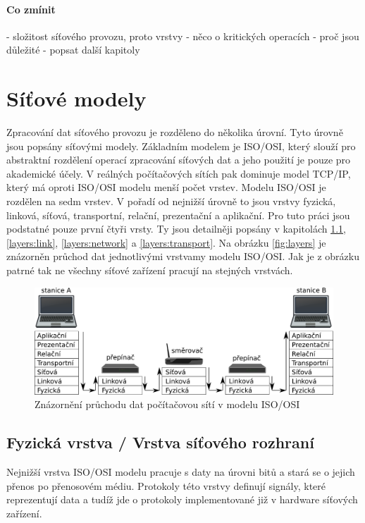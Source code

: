 \paragraph{Co zmínit}
- složitost síťového provozu, proto vrstvy
- něco o kritických operacích
- proč jsou důležité
- popsat další kapitoly

\section{Síťové modely}
Zpracování dat síťového provozu je rozděleno do několika úrovní. Tyto úrovně jsou popsány síťovými modely.
Základním modelem je ISO/OSI, který slouží pro abstraktní rozdělení operací zpracování síťových dat a jeho použití je
pouze pro akademické účely. V reálných počítačových sítích pak dominuje model TCP/IP, který má oproti
ISO/OSI modelu menší počet vrstev. Modelu ISO/OSI je rozdělen na sedm vrstev. V pořadí od nejnižší úrovně to
jsou vrstvy fyzická, linková, síťová, transportní, relační, prezentační a aplikační. Pro tuto práci jsou
podstatné pouze první čtyři vrsty. Ty jsou detailněji popsány v kapitolách \ref{layers:physical},
\ref{layers:link}, \ref{layers:network} a \ref{layers:transport}. Na obrázku \ref{fig:layers} je
znázorněn průchod dat jednotlivými vrstvamy modelu ISO/OSI. Jak je z obrázku patrné tak ne všechny síťové
zařízení pracují na stejných vrstvách.

\begin{figure}[!htb]
	\centering
	\includegraphics[scale=.25]{fig/layers.pdf}
	\caption{Znázornění průchodu dat počítačovou sítí v modelu ISO/OSI}
\end{figure}\label{fig:layers}

\subsection{Fyzická vrstva / Vrstva síťového rozhraní}\label{layers:physical}
Nejnižší vrstva ISO/OSI modelu pracuje s daty na úrovni bitů a stará se o
jejich přenos po přenosovém médiu. Protokoly této vrstvy definují signály, které reprezentují data
a tudíž jde o protokoly implementované již v hardware síťových zařízení.

